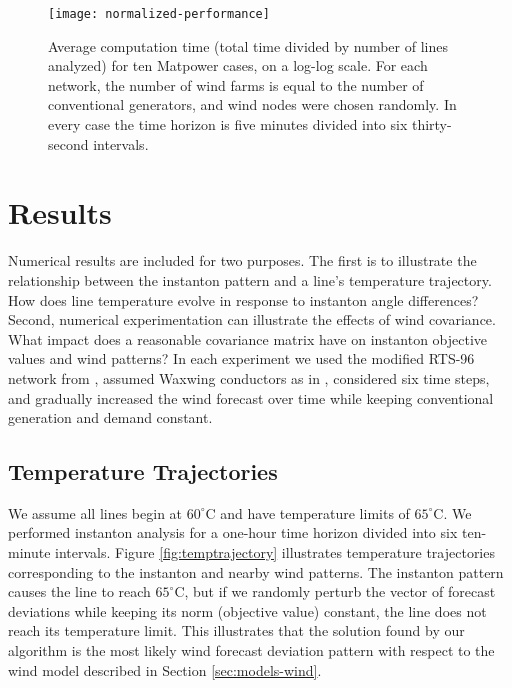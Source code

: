 \documentclass[journal,twoside]{IEEEtran}
\begin{document}
\begin{figure}[!t]
\centering
\texttt{[image: normalized-performance]}
\caption{Average computation time (total time divided by number of lines analyzed) for ten Matpower cases, on a log-log scale. For each network, the number of wind farms is equal to the number of conventional generators, and wind nodes were chosen randomly. In every case the time horizon is five minutes divided into six thirty-second intervals.}
\label{fig:normalized-performance}
\end{figure}

\section{Results}\label{sec:results}
Numerical results are included for two purposes. The first is to illustrate the relationship between the instanton pattern and a line's temperature trajectory. How does line temperature evolve in response to instanton angle differences? Second, numerical experimentation can illustrate the effects of wind covariance. What impact does a reasonable covariance matrix have on instanton objective values and wind patterns? In each experiment we used the modified RTS-96 network from \cite{pandzic}, assumed Waxwing conductors as in \cite{almassalkhi2015}, considered six time steps, and gradually increased the wind forecast over time while keeping conventional generation and demand constant.

\subsection{Temperature Trajectories}
We assume all lines begin at $60^\circ$C and have temperature limits of $65^\circ$C. We performed instanton analysis for a one-hour time horizon divided into six ten-minute intervals. Figure \ref{fig:temptrajectory} illustrates temperature trajectories corresponding to the instanton and nearby wind patterns. The instanton pattern causes the line to reach $65^\circ$C, but if we randomly perturb the vector of forecast deviations while keeping its norm (objective value) constant, the line does not reach its temperature limit. This illustrates that the solution found by our algorithm is the most likely wind forecast deviation pattern with respect to the wind model described in Section \ref{sec:models-wind}.
\end{document}
